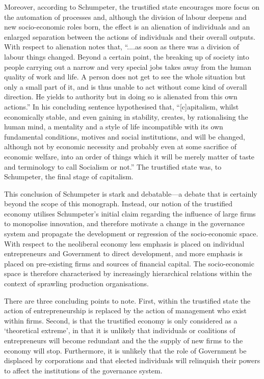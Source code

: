 Moreover, according to Schumpeter, the trustified state encourages more focus on the automation of processes and, although the division of labour deepens and new socio-economic roles born, the effect is an alienation of individuals and an enlarged separation between the actions of individuals and their overall outputs. With respect to alienation \citet[p.~77]{Milgram1973} notes that, ``....as soon as there was a division of labour things changed. Beyond a certain point, the breaking up of society into people carrying out a narrow and very special jobs takes away from the human quality of work and life. A person does not get to see the whole situation but only a small part of it, and is thus unable to act without come kind of overall direction. He yields to authority but in doing so is alienated from this own actions.'' In his concluding sentence \citet[p.~386]{Schumpeter1928} hypothesised that, ``[c]apitalism, whilst economically stable, and even gaining in stability, creates, by rationalising the human mind, a mentality and a style of life incompatible with its own fundamental conditions, motives and social institutions, and will be changed, although not by economic necessity and probably even at some sacrifice of economic welfare, into an order of things which it will be merely matter of taste and terminology to call Socialism or not.'' The trustified state was, to Schumpeter, the final stage of capitalism.

This conclusion of Schumpeter is stark and debatable---a debate that is certainly beyond the scope of this monograph. Instead, our notion of the trustified economy utilises Schumpeter's initial claim regarding the influence of large firms to monopolise innovation, and therefore motivate a change in the governance system and propagate the development or regression of the socio-economic space. With respect to the neoliberal economy less emphasis is placed on individual entrepreneurs and Government to direct development, and more emphasis is placed on pre-existing firms and sources of financial capital. The socio-economic space is therefore characterised by increasingly hierarchical relations within the context of sprawling production organisations.

There are three concluding points to note. First, within the trustified state the action of entrepreneurship is replaced by the action of management who exist within firms. Second, is that the trustified economy is only considered as a `theoretical extreme', in that it is unlikely that individuals or coalitions of entrepreneurs will become redundant and the the supply of new firms to the economy will stop. Furthermore, it is unlikely that the role of Government be displaced by corporations and that elected individuals will relinquish their powers to affect the institutions of the governance system.

